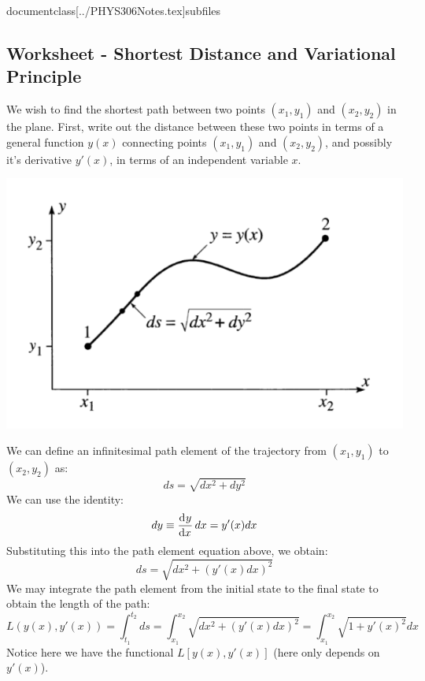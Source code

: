 documentclass[../PHYS306Notes.tex]{subfiles}


\subsection{Worksheet - Shortest Distance and Variational Principle}
\begin{p}
We wish to find the shortest path between two points $(x_1,y_1)$ and $(x_2,y_2)$ in the plane. First, write out the distance between these two points in terms of a general function $y(x)$ connecting points $(x_1,y_1)$ and $(x_2,y_2)$, and possibly it’s derivative $y'(x)$, in terms of an independent variable $x$.
\begin{center}
    \includegraphics[scale=0.6]{Lecture-1/W1-img1.png}
\end{center}
\end{p}
\begin{s}
We can define an infinitesimal path element of the trajectory from $(x_1, y_1)$ to $(x_2, y_2)$ as:
\[ ds = \sqrt{dx^2 + dy^2}\]
We can use the identity:
\[ dy \equiv \dod{y}{x}dx = y'(x)dx\]
Substituting this into the path element equation above, we obtain:
\[ds = \sqrt{dx^2 + \left(y'(x)dx\right)^2}\]
We may integrate the path element from the initial state to the final state to obtain the length of the path:
\[L(y(x), y'(x)) = \int_{t_1}^{t_2} ds = \int_{x_1}^{x_2} \sqrt{dx^2 + \left(y'(x)dx\right)^2} = \int_{x_1}^{x_2} \sqrt{1 + y'(x)^2}dx\]
Notice here we have the functional $L[y(x), y'(x)]$ (here only depends on $y'(x)$). 


\end{s}

